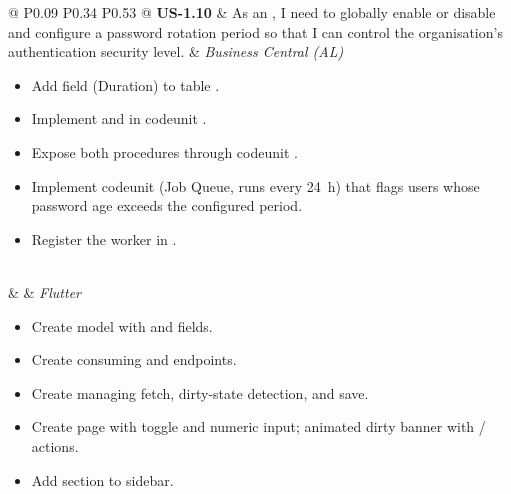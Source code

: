 \begin{longtable}{@{} P{0.09\linewidth} P{0.34\linewidth} P{0.53\linewidth} @{}}
	\textbf{US-1.10}
	& As an , I need to globally enable or disable
	 and configure a password rotation period so that I can
	control the organisation's authentication security level.
	& \noindent\textit{Business Central (AL)}
	\begin{itemize}[nosep, leftmargin=*]
		\item Add field  (Duration) to table .
		\item Implement  and  in codeunit .
		\item Expose both procedures through codeunit .
		\item Implement codeunit  (Job Queue, runs every 24~h) that flags users whose password age exceeds the configured period.
		\item Register the worker in .
	\end{itemize}
\\ & &
	\noindent\textit{Flutter}
	\begin{itemize}[nosep, leftmargin=*]
		\item Create model  with  and  fields.
		\item Create  consuming  and  endpoints.
		\item Create  managing fetch, dirty-state detection, and save.
		\item Create page  with toggle and numeric input; animated dirty banner with  /  actions.
		\item Add  section to  sidebar.
	\end{itemize}\\
	\midrule


\end{longtable}
